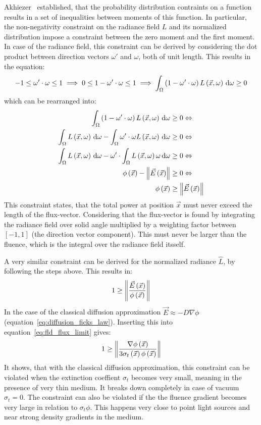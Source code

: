 Akhiezer~\cite{Akhiezer65} established, that the probability distribution contraints on a function results in a set of inequalities between moments of this function. In particular, the non-negativity constraint on the radiance field $L$ and its normalized distribution impose a constraint between the zero moment and the first moment. In case of the radiance field, this constraint can be derived by considering the dot product between direction vectors $\omega'$ and $\omega$, both of unit length. This results in the equation:
\begin{align*}
-1 \le \omega'\cdot\omega \le 1
\implies
0 \le 1 - \omega'\cdot\omega \le 1
\implies
\int_{\Omega}{\left(1-\omega'\cdot\omega\right)L\left(\vec{x}, \omega\right)\,\mathrm{d}\omega}\ge 0
\end{align*}
which can be rearranged into:
\begin{align*}
\int_{\Omega}{\left(1-\omega'\cdot\omega\right)L\left(\vec{x}, \omega\right)\,\mathrm{d}\omega} &\ge 0
\Leftrightarrow
\\
\int_{\Omega}{L\left(\vec{x}, \omega\right)\,\mathrm{d}\omega}
-\int_{\Omega}{\omega'\cdot\omega L\left(\vec{x}, \omega\right)\,\mathrm{d}\omega}
&\ge 0
\Leftrightarrow
\\
\int_{\Omega}{L\left(\vec{x}, \omega\right)\,\mathrm{d}\omega}
-\omega'\cdot\int_{\Omega}{L\left(\vec{x}, \omega\right)\omega\,\mathrm{d}\omega}
&\ge 0
\Leftrightarrow
\\
\phi\left(\vec{x}\right)
-\left\lVert\vec{E}\left(\vec{x}\right)\right\rVert
&\ge 0
\Leftrightarrow
\\
\phi\left(\vec{x}\right)
&\ge \left\lVert\vec{E}\left(\vec{x}\right)\right\rVert
\end{align*}
This constraint states, that the total power at position $\vec{x}$ must never exceed the length of the flux-vector. Considering that the flux-vector is found by integrating the radiance field over solid angle multiplied by a weighting factor between $\left[-1, 1\right]$ (the direction vector component). This must never be larger than the fluence, which is the integral over the radiance field itsself.

A very similar constraint can be derived for the normalized radiance $\widehat{L}$, by following the steps above. This results in:
\begin{align}
\label{eq:fld_flux_limit}
1
\ge
\left\lVert
\frac{\vec{E}\left(\vec{x}\right)}{\phi\left(\vec{x}\right)}
\right\rVert
\end{align}
In the case of the classical diffusion approximation $\vec{E}\approx-D\nabla\phi$ (equation~\ref{eq:diffusion_ficks_law}). Inserting this into equation~\ref{eq:fld_flux_limit} gives:
\begin{align}
\label{eq:fld_flux_limit}
1
\ge
\left\lVert
\frac{\nabla\phi\left(\vec{x}\right)}{3\sigma_t\left(\vec{x}\right)\phi\left(\vec{x}\right)}
\right\rVert
\end{align}
It shows, that with the classical diffusion approximation, this constraint can be violated when the extinction coeffient $\sigma_t$ becomes very small, meaning in the presence of very thin medium. It breaks down completely in case of vacuum $\sigma_t=0$. The constraint can also be violated if the the fluence gradient becomes very large in relation to $\sigma_t\phi$. This happens very close to point light sources and near strong density gradients in the medium.

